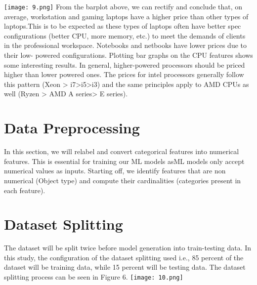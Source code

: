 \documentclass[
11pt, %
english, %
singlespacing, %
headsepline, %
]{MastersDoctoralThesis} %
\begin{document}
        \texttt{[image: 9.png]}\break
From the barplot above, we can rectify and conclude that, on average, workstation and gaming laptops have a higher price than other types of laptops.This is to be expected as these types of laptops often have better spec configurations (better CPU, more memory, etc.) to meet the demands of clients in the professional workspace. Notebooks and netbooks have lower prices due to their low- powered configurations. 
Plotting bar graphs on the CPU features shows some interesting results. In general, higher-powered 
processors should be priced higher than lower powered ones. The prices for intel processors 
generally follow this pattern (Xeon > i7>i5>i3) and 
the same principles apply to AMD CPUs as well
(Ryzen > AMD A series> E series).
\hfill
\section{Data Preprocessing}
In this section, we will relabel and convert
categorical features into numerical features. This is 
essential for training our ML models asML models 
only accept numerical values as inputs.
Starting off, we identify features that are non numerical (Object type) and compute their
cardinalities (categories present in each feature).

\section{Dataset Splitting}
The dataset will be split twice before model 
generation into train-testing data. In this study, the 
configuration of the dataset splitting used i.e., 
85 percent of the dataset will be training data, while 15 percent
will be testing data. The dataset splitting process can 
be seen in Figure 6.\hfill\break\break
\texttt{[image: 10.png]}
\end{document}
